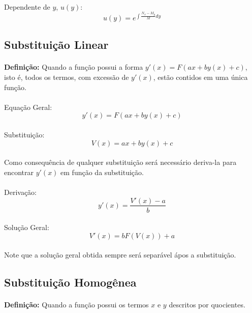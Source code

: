 \documentclass{article}
\begin{document}
\begin{enumerate}[rightmargin = \leftmargin]
        \paragraph{}Dependente de $y$, $u(y)$:
            \[u(y)=e^{\int{\frac{N_{x}-M_{y}}{M}dy}}\]
    
    \subsection{Substituição Linear}
        \paragraph{}\textbf{Definição:} Quando a função possui a forma $y'(x)=F(ax+by(x)+c)$, isto é, todos os termos, com excessão de $y'(x)$, estão contidos em uma única função.
        \paragraph{}Equação Geral:
            \[y'(x)=F(ax+by(x)+c)\]
        \paragraph{}Substituição:
            \[V(x)=ax+by(x)+c\]
        \paragraph{}Como consequência de qualquer substituição será necessário deriva-la para encontrar $y'(x)$ em função da substituição.
        \paragraph{}Derivação:
            \[y'(x)=\frac{V'(x)-a}{b}\]
        \paragraph{}Solução Geral:
            \[V'(x)=bF(V(x))+a\]
        \paragraph{}Note que a solução geral obtida sempre será separável ápos a substituição.
    
    \subsection{Substituição Homogênea}
        \paragraph{}\textbf{Definição:} Quando a função possui os termos $x$ e $y$ descritos por quocientes.

\end{enumerate}
\end{document}
